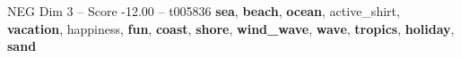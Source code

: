 \begin{textsample}{NEG Dim 3 – Score -12.00 – t005836}  \label{ex:f3_neg_031}
\textbf{sea}, \textbf{beach}, \textbf{ocean}, active\_shirt, \textbf{vacation}, happiness, \textbf{fun}, \textbf{coast}, \textbf{shore}, \textbf{wind\_wave}, \textbf{wave}, \textbf{tropics}, \textbf{holiday}, \textbf{sand}

\end{textsample}
